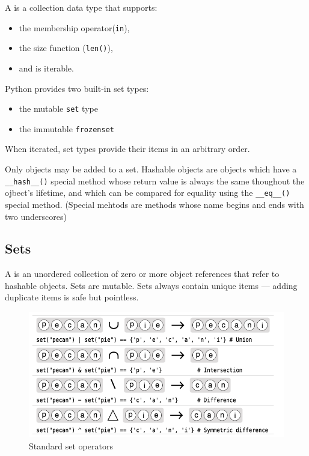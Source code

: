 \begin{tcolorbox}
A  is a collection data type that supports:
\begin{itemize}
\item the membership operator(\verb|in|),
\item the size function (\verb|len()|),
\item and is iterable.
\end{itemize}
Python provides two built-in set types:
\begin{itemize}
\item the mutable \verb|set| type
\item the immutable \verb|frozenset|
\end{itemize}
When iterated, set types provide their items in an arbitrary order.
\end{tcolorbox}



Only  objects may be added to a set.
Hashable objects are objects which have a \verb|__hash__()| special method whose return value is always the same thoughout the ojbect's lifetime, and which can be compared for equality using the \verb|__eq__()| special method.
(Special mehtods are methods whose name begins and ends with two underscores)



\subsection{Sets}

A  is an unordered collection of zero or more object references that refer to hashable objects.
Sets are mutable.
Sets always contain unique items --- adding duplicate items is safe but pointless.


\begin{figure}[!ht]
  \centering
  \includegraphics[width=\textwidth]{pics/standard-set-operators}
  \caption{Standard set operators}
  \label{fig:standard-set-operators}
\end{figure}


